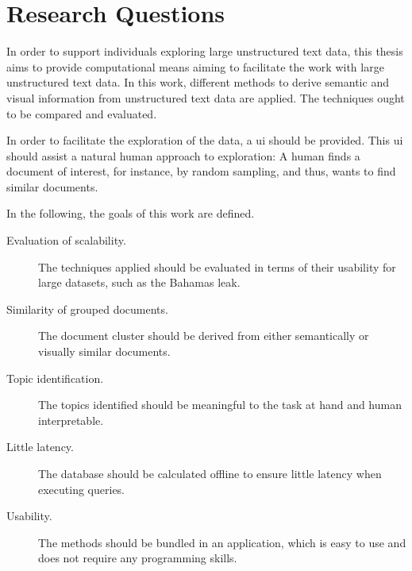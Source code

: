 \section{Research Questions}\label{sec:research-questions}

In order to support individuals exploring large unstructured text data, this thesis aims to provide computational means aiming to facilitate the work with large unstructured text data.
In this work, different methods to derive semantic and visual information from unstructured text data are applied.
The techniques ought to be compared and evaluated.

In order to facilitate the exploration of the data, a \ac{ui} should be provided.
This \ac{ui} should assist a natural human approach to exploration:
A human finds a document of interest, for instance, by random sampling, and thus, wants to find similar documents.

In the following, the goals of this work are defined.
\begin{description}
    \item[Evaluation of scalability.]
    The techniques applied should be evaluated in terms of their usability for large datasets, such as the Bahamas leak.
    \item[Similarity of grouped documents.]
    The document cluster should be derived from either semantically or visually similar documents.
    \item[Topic identification.]
    The topics identified should be meaningful to the task at hand and human interpretable.  
    \item[Little latency.]
    The database should be calculated offline to ensure little latency when executing queries.
    \item[Usability.]
    The methods should be bundled in an application, which is easy to use and does not require any programming skills.
\end{description}